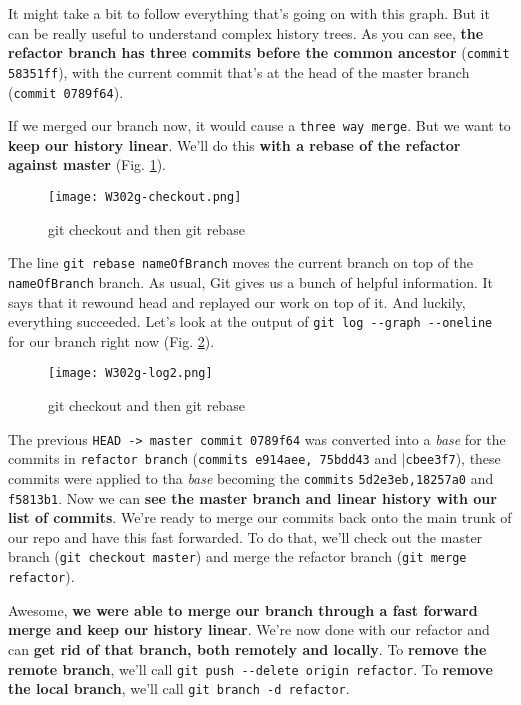 	It might take a bit to follow everything that's going on with this graph. But it can be really useful to understand complex history trees. As you can see, \textbf{the refactor branch has three commits before the common ancestor} (\verb|commit 58351ff|), with the current commit that's at the head of the master branch (\verb|commit 0789f64|). 
	
	If we merged our branch now, it would cause a \verb|three way merge|. But we want to \textbf{keep our history linear}. We'll do this \textbf{with a rebase of the refactor against master} (Fig. \ref{W302g-checkout}).
	
	\begin{figure} 
		\caption{git checkout and then git rebase}
		\centering
		\texttt{[image: W302g-checkout.png]}
		\label{W302g-checkout}
	\end{figure}
	
	The line \verb|git rebase nameOfBranch| moves the current branch on top of the \verb|nameOfBranch| branch.
	As usual, Git gives us a bunch of helpful information. It says that it rewound head and replayed our work on top of it. And luckily, everything succeeded. Let's look at the output of \verb|git log --graph --oneline| for our branch right now (Fig. \ref{W302g-log2}).
	
	\begin{figure} 
		\caption{git checkout and then git rebase}
		\centering
		\texttt{[image: W302g-log2.png]}
		\label{W302g-log2}
	\end{figure}
	
	The previous \verb|HEAD -> master commit 0789f64| was converted into a \textit{base} for the commits in \verb|refactor branch| (\verb|commits e914aee, 75bdd43| and |\verb|cbee3f7|), these commits were applied to tha \textit{base} becoming the \verb|commits| \verb|5d2e3eb,18257a0| and \verb|f5813b1|.
	Now we can \textbf{see the master branch and linear history with our list of commits}. We're ready to merge our commits back onto the main trunk of our repo and have this fast forwarded. To do that, we'll check out the master branch (\verb|git checkout master|) and merge the refactor branch (\verb|git merge refactor|).
	
	Awesome,\textbf{ we were able to merge our branch through a fast forward merge and keep our history linear}. We're now done with our refactor and can \textbf{get rid of that branch, both remotely and locally}. To \textbf{remove the remote branch}, we'll call \verb|git push --delete origin refactor|. To \textbf{remove the local branch}, we'll call \verb|git branch -d refactor|.
	
